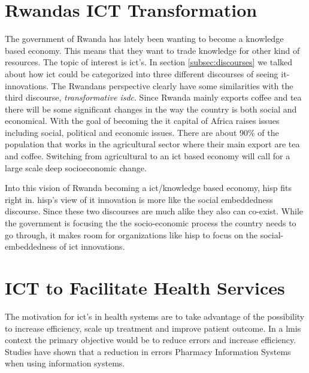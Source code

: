 \section{Rwandas ICT Transformation}
The government of Rwanda has lately been wanting to become a knowledge based economy. 
This means that they want to trade knowledge for other kind of resources. 
The topic of interest is \gls{ict}'s.
In section \ref{subsec:discourses} we talked about how \gls{ict} could be categorized into three different discourses of seeing \gls{it}-innovations. 
The Rwandans perspective clearly have some similarities with the third discourse, \textit{transformative \gls{isdc}}. 
Since Rwanda mainly exports coffee and tea there will be some significant changes in the way the country is both social and economical. 
With the goal of becoming the \gls{it} capital of Africa raises issues including social, political and economic issues. 
There are about 90\% of the population that works in the agricultural sector where their main export are tea and coffee. 
Switching from agricultural to an \gls{ict} based economy will call for a large scale deep socioeconomic change.

Into this vision of Rwanda becoming a \gls{ict}/knowledge based economy, \gls{hisp} fits right in.
\gls{hisp}'s view of \gls{it} innovation is more like the social embeddedness discourse.
Since these two discourses are much alike they also can co-exist. While the government is focusing the the socio-economic process the country needs to go through, it makes room for organizations like \gls{hisp} to focus on the social-embeddedness of \gls{ict} innovations.

\cite{overview:rdb}
\cite{rw:snl}

\section{ICT to Facilitate Health Services}
The motivation for \gls{ict}'s in health systems are to take advantage of the possibility to increase efficiency, scale up treatment and improve patient outcome. 
In a \gls{lmis} context the primary objective would be to reduce errors and increase efficiency.
Studies have shown that a reduction in errors Pharmacy Information Systems when using information systems. 

\cite{ehealth:blaya}
